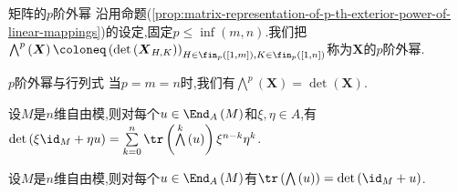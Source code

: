 \begin{definition}{矩阵的$p$阶外幂}{}
	沿用命题(\ref{prop:matrix-representation-of-p-th-exterior-power-of-linear-mappings})的设定,固定$p\leq\inf\left(m,n\right)$.我们把$\bigwedge^{p}\left(\boldsymbol{X}\right)\coloneq\left(\det\left(\boldsymbol{X}_{H,K}\right)\right)_{H\in\fin_{p}\left(\left[1,m\right]\right),K\in\fin_{p}\left(\left[1,n\right]\right)}$称为$\boldsymbol{X}$的$p$阶外幂.
\end{definition}

\begin{remark}{$p$阶外幂与行列式}{}
	当$p=m=n$时,我们有$\bigwedge\limits^{p}\left(\boldsymbol{X}\right)=\det\left(\boldsymbol{X}\right)$.
\end{remark}

\begin{proposition}{}{}
	设$M$是$n$维自由模,则对每个$u\in\End_{A}\left(M\right)$和$\xi,\eta\in A$,有$\det\left(\xi\id_{M}+\eta u\right)=\sum\limits_{k=0}^{n}\tr\left(\bigwedge\limits^{k}\left(u\right)\right)\xi^{n-k}\eta^{k}$.
\end{proposition}

\begin{corollary}{}{}
	设$M$是$n$维自由模,则对每个$u\in\End_{A}\left(M\right)$有$\tr\left(\bigwedge\left(u\right)\right)=\det\left(\id_{M}+u\right)$.
\end{corollary}
































































































